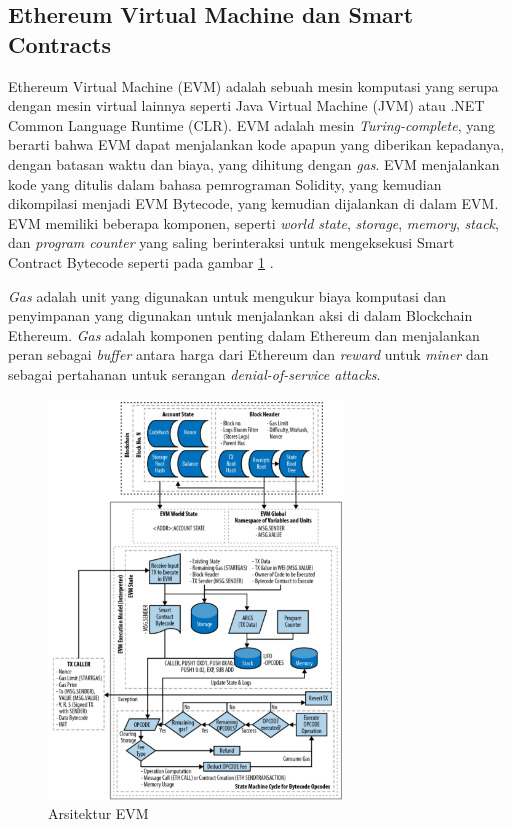 \subsection{Ethereum Virtual Machine dan Smart Contracts}
\label{subsec:evm-smart-contract}

Ethereum Virtual Machine (EVM) adalah sebuah mesin komputasi yang serupa dengan mesin virtual lainnya seperti Java Virtual Machine (JVM) atau .NET Common Language Runtime (CLR). EVM adalah mesin \textit{Turing-complete}, yang berarti bahwa EVM dapat menjalankan kode apapun yang diberikan kepadanya, dengan batasan waktu dan biaya, yang dihitung dengan \textit{gas}. EVM menjalankan kode yang ditulis dalam bahasa pemrograman Solidity, yang kemudian dikompilasi menjadi EVM Bytecode, yang kemudian dijalankan di dalam EVM. EVM memiliki beberapa komponen, seperti \textit{world state}, \textit{storage}, \textit{memory}, \textit{stack}, dan \textit{program counter} yang saling berinteraksi untuk mengeksekusi Smart Contract Bytecode seperti pada gambar \ref{image:evm-architecture} \parencite{wood2014ethereum}.

\textit{Gas} adalah unit yang digunakan untuk mengukur biaya komputasi dan penyimpanan yang digunakan untuk menjalankan aksi di dalam Blockchain Ethereum. \textit{Gas} adalah komponen penting dalam Ethereum dan menjalankan peran sebagai \textit{buffer} antara harga dari Ethereum dan \textit{reward} untuk \textit{miner} dan sebagai pertahanan untuk serangan \textit{denial-of-service attacks}.

\begin{figure}[ht]
	\centering
	\includegraphics[width=0.7\textwidth]{resources/chapter-2/evm-architecture.png}
	\caption{Arsitektur EVM \parencite{antonopoulos2018mastering}}
	\label{image:evm-architecture}
\end{figure}

